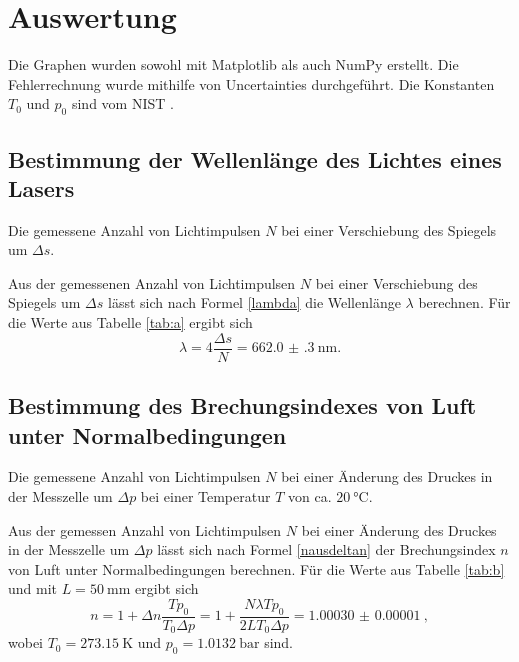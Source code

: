 \section{Auswertung}
\label{sec:Auswertung}


Die Graphen wurden sowohl mit Matplotlib \cite{matplotlib} als auch NumPy \cite{numpy} erstellt. Die
Fehlerrechnung wurde mithilfe von Uncertainties \cite{uncertainties} durchgeführt.
Die Konstanten $T_0$ und $p_0$ sind vom NIST \cite{nistgov}.

\subsection{Bestimmung der Wellenlänge des Lichtes eines Lasers}
\begin{table}
	\centering
	\caption{Die gemessene Anzahl von Lichtimpulsen $N$ bei einer Verschiebung des Spiegels um $\Delta s$.}
	
	\label{tab:a}
\end{table}
Aus der gemessenen Anzahl von Lichtimpulsen $N$ bei einer Verschiebung des Spiegels um $\Delta s$ lässt sich nach Formel \eqref{lambda} die Wellenlänge $\lambda$ berechnen.
Für die Werte aus Tabelle \ref{tab:a} ergibt sich
\begin{equation}
	\lambda = 4 \frac{\Delta s}{N}=\SI{662.0(3)}{\nano\meter}.
\end{equation}


\subsection{Bestimmung des Brechungsindexes von Luft unter Normalbedingungen}
\begin{table}
	\centering
	\caption{Die gemessene Anzahl von Lichtimpulsen $N$ bei einer Änderung des Druckes in der Messzelle um $\Delta p$ bei einer Temperatur $T$ von ca. $\SI{20}{\degreeCelsius}$.}
	
	\label{tab:b}
\end{table}
Aus der gemessen Anzahl von Lichtimpulsen $N$ bei einer Änderung des Druckes in der Messzelle um $\Delta p$ lässt sich nach Formel \eqref{nausdeltan} der Brechungsindex $n$ von Luft unter Normalbedingungen berechnen.
Für die Werte aus Tabelle \ref{tab:b} und mit $L=\SI{50}{\milli\meter}$ ergibt sich
\begin{equation}
	n = 1 + \Delta n \frac{T p_0}{T_0 \Delta p} = 1+ \frac{N \lambda T p_0}{2 L T_0 \Delta p} = \SI{1.00030(1)}{},
\end{equation}
wobei $T_0=\SI{273,15}{\kelvin}$ und $p_0=\SI{1,0132}{\bar}$ sind.
